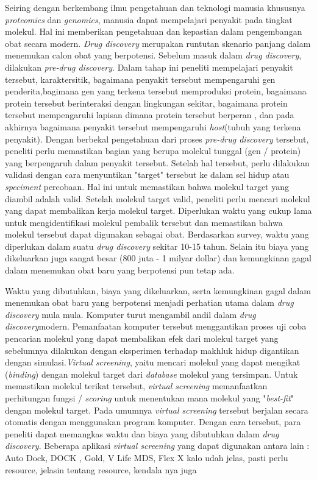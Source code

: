 Seiring dengan berkembang ilmu pengetahuan dan teknologi manusia khususnya \textit{proteomics} dan \textit{genomics}, manusia dapat mempelajari penyakit pada tingkat molekul. Hal ini memberikan pengetahuan dan kepastian dalam pengembangan obat secara modern. \textit{Drug discovery} merupakan runtutan skenario panjang dalam menemukan calon obat yang berpotensi. Sebelum masuk dalam \textit{drug discovery}, dilakukan \textit{pre-drug discovery}. Dalam tahap ini peneliti mempelajari penyakit tersebut, karaktersitik, bagaimana penyakit tersebut mempengaruhi gen penderita,bagimana gen yang terkena tersebut memproduksi protein, bagaimana protein tersebut berinteraksi dengan lingkungan sekitar, bagaimana protein tersebut mempengaruhi lapisan dimana protein tersebut berperan , dan pada akhirnya bagaimana penyakit tersebut mempengaruhi \textit{host}(tubuh yang terkena penyakit). Dengan berbekal pengetahuan dari proses \textit{pre-drug discovery} tersebut, peneliti perlu memastikan bagian yang berupa molekul tunggal (gen / protein) yang berpengaruh dalam penyakit tersebut. Setelah hal tersebut, perlu dilakukan validasi dengan cara menyuntikan "target" tersebut ke dalam sel hidup atau \textit{speciment} percobaan. Hal ini untuk memastikan bahwa molekul target yang diambil adalah valid. Setelah molekul target valid, peneliti perlu mencari molekul yang dapat membalikan kerja molekul target. Diperlukan waktu yang cukup lama untuk mengidentifikasi molekul pembalik tersebut dan memastikan bahwa molekul tersebut dapat digunakan sebagai obat. Berdasarkan survey, waktu yang diperlukan dalam suatu \textit{drug discovery} sekitar 10-15 tahun. Selain itu biaya yang dikeluarkan juga sangat besar (800 juta - 1 milyar dollar) dan kemungkinan gagal dalam menemukan obat baru yang berpotensi pun tetap ada.         

Waktu yang dibutuhkan, biaya yang dikeluarkan, serta kemungkinan gagal dalam menemukan obat baru yang berpotensi menjadi perhatian utama dalam \textit{drug discovery} mula mula. Komputer turut mengambil andil dalam \textit{drug discovery}modern. Pemanfaatan komputer tersebut menggantikan proses uji coba pencarian molekul yang dapat membalikan efek dari molekul target yang sebelumnya dilakukan dengan eksperimen terhadap makhluk hidup digantikan dengan simulasi.\textit{Virtual screening}, yaitu mencari molekul yang dapat mengikat (\textit{binding}) dengan molekul target dari \textit{database} molekul yang tersimpan. Untuk memastikan molekul terikat tersebut, \textit{virtual screening} memanfaatkan perhitungan fungsi / \textit{scoring} untuk menentukan mana molekul yang "\textit{best-fit}" dengan molekul target. Pada umumnya \textit{virtual screening} tersebut berjalan secara otomatis dengan menggunakan program komputer. Dengan cara tersebut, para peneliti dapat memangkas waktu dan biaya yang dibutuhkan dalam \textit{drug discovery}. Beberapa aplikasi \textit{virtual screening} yang dapat digunakan antara lain : Auto Dock, DOCK , Gold, V Life MDS, Flex X         
kalo udah jelas, pasti perlu resource, jelasin tentang resource, kendala nya juga

